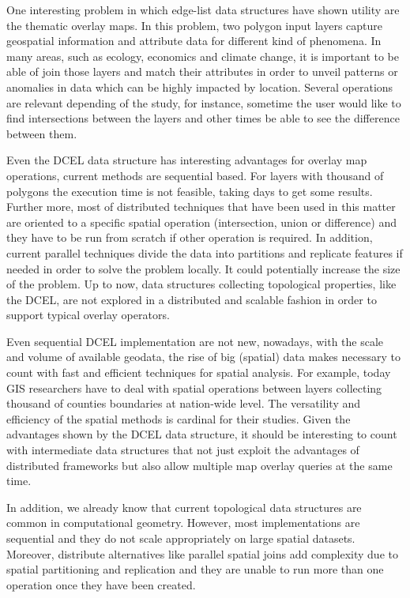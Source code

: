 One interesting problem in which edge-list data structures have shown utility are the thematic overlay maps. In this problem, two polygon input layers capture geospatial information and attribute data for different kind of phenomena.  In many areas, such as ecology, economics and climate change, it is important to be able of join those layers and match their attributes in order to unveil patterns or anomalies in data which can be highly impacted by location.  Several operations are relevant depending of the study, for instance, sometime the user would like to find intersections between the layers and other times be able to see the difference between them. 

Even the DCEL data structure has interesting advantages for overlay map operations, current methods are sequential based.  For layers with thousand of polygons the execution time is not feasible, taking days to get some results.  Further more, most of distributed techniques that have been used in this matter are oriented to a specific spatial operation (intersection, union or difference) and they have to be run from scratch if other operation is required.  In addition, current parallel techniques divide the data into partitions and replicate features if needed in order to solve the problem locally.  It could potentially increase the size of the problem.  Up to now, data structures collecting topological properties, like the DCEL, are not explored in a distributed and scalable fashion in order to support typical overlay operators.

Even sequential DCEL implementation are not new, nowadays, with the scale and volume of available geodata, the rise of big (spatial) data makes necessary to count with fast and efficient techniques for spatial analysis.  For example, today GIS researchers have to deal with spatial operations between layers collecting thousand of counties boundaries at nation-wide level.  The versatility and efficiency of the spatial methods is cardinal for their studies. Given the advantages shown by the DCEL data structure, it should be interesting to count with intermediate data structures that not just exploit the advantages of distributed frameworks but also allow multiple map overlay queries at the same time. 

In addition, we already know that current topological data structures are common in computational geometry.  However, most implementations are sequential and they do not scale appropriately on large spatial datasets.  Moreover, distribute alternatives like parallel spatial joins add complexity due to spatial partitioning and replication and they are unable to run more than one operation once they have been created.

